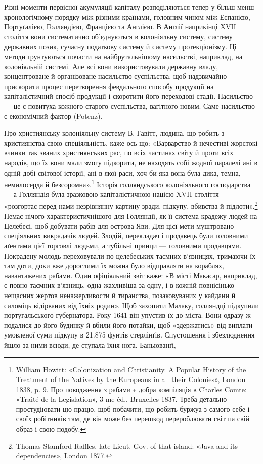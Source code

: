 Різні моменти первісної акумуляції капіталу розподіляються
тепер у більш-менш хронологічному порядку між різними країнами,
головним чином між Еспанією, Портуґалією, Голляндією,
Францією та Англією. В Англії наприкінці XVII століття вони
систематично об’єднуються в колоніяльну систему, систему державних
позик, сучасну податкову систему й систему протекціонізму.
Ці методи ґрунтуються почасти на найбрутальнішому
насильстві, наприклад, на колоніяльній системі. Але всі вони
використовували державну владу, концентроване й організоване
насильство суспільства, щоб надзвичайно прискорити процес
перетворення февдального способу продукції на капіталістичний
спосіб продукції і скоротити його переходові стадії. Насильство —
це є повитуха кожного старого суспільства, вагітного новим.
Саме насильство є економічний фактор (Potenz).

Про християнську колоніяльну систему В. Гавітт, людина,
що робить з християнства свою спеціяльність, каже ось що:
«Варварство й нечестиві жорстокі вчинки так званих християнських
рас, по всіх частинах світу й проти всіх народів, що їх
вони мали змогу підкорити, не находять собі жодної паралелі
ані в одній добі світової історії, ані в якої раси, хоч би яка вона
була дика, темна, немилосерда й безсоромна».\footnote{
William Howitt: «Colonization and Christianity. A Popular History
of the Treatment of the Natives by the Europeans in all their Colonies»,
London 1838, p. 9. Про поводження з рабами є добра компіляція в Charles
Comte: «Traité de la Legislation», 3-me éd., Bruxelles 1837. Треба детально
простудіювати цю працю, щоб побачити, що робить буржуа з
самого себе і своїх робітників там, де він може без перешкод перероблювати
світ па свій образ і свою подобу.
} Історія голляндського
колоніяльного господарства — а Голляндія була
зразковою капіталістичною нацією XVII століття — «розгортає
перед нами незрівнянну картину зради, підкупу, вбивства
й підлоти».\footnote{
Thomas Stamford Raffles, late Lieut. Gov. of that island: «Java
and its dependencies», London 1877.
} Немає нічого характеристичнішого для Голляндії,
як її система крадежу людей на Целебесі, щоб добувати рабів
для острова Яви. Для цієї мети муштровано спеціяльних викрадачів
людей. Злодій, перекладач і продавець були головними аґентами
цієї торговлі людьми, а тубільні принци — головними продавцями.
Покрадену молодь переховували по целебеських таємних в’язницях,
тримаючи їх там доти, доки вже дорослими їх можна було
відправляти на кораблях, навантажених рабами. Один офіціяльний
звіт каже: «В місті Макасар, наприклад, є повно таємних в’язниць,
одна жахливіша за одну, і в кожній повнісінько нещасних
жертов ненажерливости й тиранства, позаковуваних у кайдани
й силоміць відірваних від їхніх родин». Щоб захопити Малаку,
голляндці підкупили португальського губернатора. Року 1641
він упустив їх до міста. Вони одразу ж подалися до його будинку
й вбили його потайки, щоб «здержатись» від виплати умовленої
суми підкупу в 21.875 фунтів стерлінґів. Спустошення і збезлюднення
йшло за ними всюди, де ступала їхня нога. Баньюванґі,